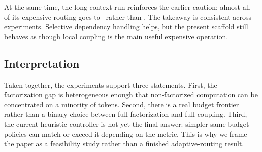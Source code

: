 At the same time, the long-context run reinforces the earlier caution: almost all of its expensive routing goes to \coupled\ rather than \micro. The takeaway is consistent across experiments. Selective dependency handling helps, but the present scaffold still behaves as though local coupling is the main useful expensive operation.

\subsection{Interpretation}

Taken together, the experiments support three statements. First, the factorization gap is heterogeneous enough that non-factorized computation can be concentrated on a minority of tokens. Second, there is a real budget frontier rather than a binary choice between full factorization and full coupling. Third, the current heuristic controller is not yet the final answer: simpler same-budget policies can match or exceed it depending on the metric. This is why we frame the paper as a feasibility study rather than a finished adaptive-routing result.
